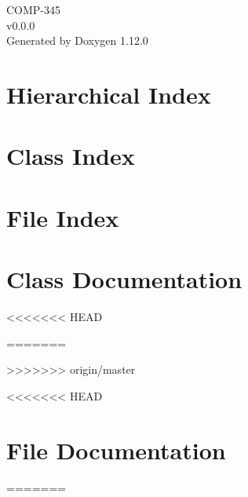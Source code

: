 \documentclass[twoside]{book}
\newcommand{\+}{\discretionary{\mbox{\scriptsize$\hookleftarrow$}}{}{}}
\newcommand{\clearemptydoublepage}{%
    \newpage{\pagestyle{empty}\cleardoublepage}%
  }
\begin{document}
  \raggedbottom
    \hypersetup{pageanchor=false,
                bookmarksnumbered=true,
                pdfencoding=unicode
               }
  \begin{titlepage}
  \vspace*{7cm}
  \begin{center}%
  {\Large COMP-\/345}\\
  [1ex]\large v0.\+0.\+0 \\
  \vspace*{1cm}
  {\large Generated by Doxygen 1.12.0}\\
  \end{center}
  \end{titlepage}
  \clearemptydoublepage
  \tableofcontents
  \clearemptydoublepage
  \hypersetup{pageanchor=true}
\chapter{Hierarchical Index}

\chapter{Class Index}

\chapter{File Index}

\chapter{Class Documentation}
<<<<<<< HEAD

=======




>>>>>>> origin/master








<<<<<<< HEAD







\chapter{File Documentation}
=======





\end{document}
